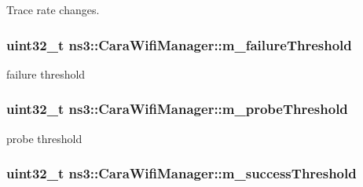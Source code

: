 Trace rate changes. 

\subsubsection[{\texorpdfstring{m\+\_\+failure\+Threshold}{m_failureThreshold}}]{\setlength{\rightskip}{0pt plus 5cm}uint32\+\_\+t ns3\+::\+Cara\+Wifi\+Manager\+::m\+\_\+failure\+Threshold\hspace{0.3cm}{\ttfamily [private]}}\hypertarget{classns3_1_1CaraWifiManager_a4558af4c0968838cd480a98624af7a27}{}\label{classns3_1_1CaraWifiManager_a4558af4c0968838cd480a98624af7a27}


failure threshold 

\subsubsection[{\texorpdfstring{m\+\_\+probe\+Threshold}{m_probeThreshold}}]{\setlength{\rightskip}{0pt plus 5cm}uint32\+\_\+t ns3\+::\+Cara\+Wifi\+Manager\+::m\+\_\+probe\+Threshold\hspace{0.3cm}{\ttfamily [private]}}\hypertarget{classns3_1_1CaraWifiManager_ad08556bdda27678ebce6c1439a8f8845}{}\label{classns3_1_1CaraWifiManager_ad08556bdda27678ebce6c1439a8f8845}


probe threshold 

\subsubsection[{\texorpdfstring{m\+\_\+success\+Threshold}{m_successThreshold}}]{\setlength{\rightskip}{0pt plus 5cm}uint32\+\_\+t ns3\+::\+Cara\+Wifi\+Manager\+::m\+\_\+success\+Threshold\hspace{0.3cm}{\ttfamily [private]}}\hypertarget{classns3_1_1CaraWifiManager_a8ab462541b8e54a9d45849946fbce8c7}{}\label{classns3_1_1CaraWifiManager_a8ab462541b8e54a9d45849946fbce8c7}


